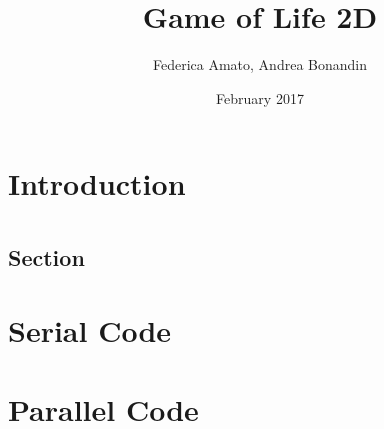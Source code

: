 \documentclass{report}%
\begin{document}
\title{Game of Life 2D}
\author{Federica Amato, Andrea Bonandin}
\date{February 2017}
\maketitle
\tableofcontents


\chapter{Introduction}



\chapter{}

\section{Section}






\appendix

\chapter{Serial Code}



\chapter{Parallel Code}



\begin{thebibliography}{9}

\end{thebibliography}
\end{document}
